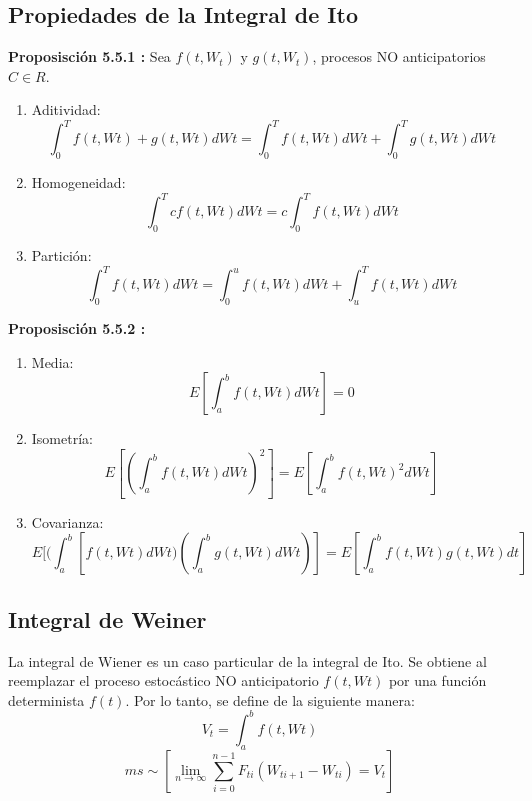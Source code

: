 \documentclass[11pt,fleqn]{book} %
\numberwithin{equation}{section} %
\numberwithin{figure}{section} %
\numberwithin{table}{section} %
\begin{document}
\subsection{Propiedades de la Integral de Ito}
\textbf{Proposisción 5.5.1 :} Sea $f(t, W_{t})$ y $ g(t,W_{t})$, procesos NO  anticipatorios  $C \in R$.
\begin{enumerate}
    \item Aditividad:
    $$ \int_{0}^{T} f(t, Wt) + g(t,Wt) dWt =  \int_{0}^{T} f(t, Wt) dWt +  \int_{0}^{T}  g(t,Wt) dWt  $$
    \item Homogeneidad:
    $$ \int_{0}^{T} c f(t, Wt) dWt =  c \int_{0}^{T} f(t, Wt) dWt $$
    \item Partición:
    $$ \int_{0}^{T} f(t, Wt) dWt = \int_{0}^{u} f(t, Wt) dWt + \int_{u}^{T} f(t, Wt) dWt $$
\end{enumerate}
\textbf{Proposisción 5.5.2 :} 
\begin{enumerate}
    \item Media: 
    $$E[\int_{a}^{b} f(t, Wt) dWt]  = 0$$
    \item Isometría:
    $$ E[(\int_{a}^{b} f(t, Wt) dWt)^2]  = E[\int_{a}^{b}  f(t, Wt)^2 dWt]$$
    \item Covarianza:
    $$ E[(\int_{a}^{b} [f(t, Wt) dWt) (\int_{a}^{b} g(t,Wt) dWt )]  = E[ \int_{a}^{b}  f(t, Wt) g(t,Wt) dt] $$
\end{enumerate}
\subsection{Integral de Weiner}
La integral de Wiener es un caso particular de la integral de Ito. Se obtiene al reemplazar el proceso estocástico NO anticipatorio $f(t, Wt)$ por una función determinista $f(t)$. Por lo tanto, se define de la siguiente manera:
$$V_t = \int_{a}^{b} f(t, Wt)$$
$$ms\sim [\lim_{n \to \infty} \sum_{i=0}^{n-1}F_{ti}(W_{ti+1}-W_{ti})= V_{t}]$$
\end{document}
